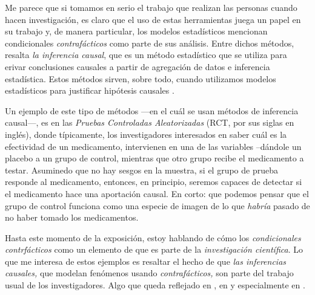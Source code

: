 Me parece que si tomamos en serio el trabajo que realizan las
personas cuando hacen investigación, es claro que el uso de estas
herramientas juega un papel en su trabajo y, de manera particular,
los modelos estadísticos mencionan condicionales
\emph{contrafácticos} como parte de sus análisis. Entre dichos
métodos, resalta \emph{la inferencia causal}, que es un método
estadístico que se utiliza para erivar conclusiones causales a
partir de agregación de datos e inferencia estadística. Estos
métodos sirven, sobre todo, cuando utilizamos modelos estadísticos
para justificar hipótesis causales \parencite{Pearl2016, Pearl2018}.

Un ejemplo de este tipo de métodos ---en el cuál se usan
métodos de inferencia causal---, es en las \emph{Pruebas Controladas
	Aleatorizadas} (RCT, por sus siglas en inglés), donde típicamente,
los investigadores interesados en saber cuál es la efectividad de un
medicamento, intervienen en una de las variables --dándole un
placebo a un grupo de control, mientras que otro grupo recibe el
medicamento a testar. Asuminedo que no hay sesgos en la muestra, si
el grupo de prueba responde al medicamento, entonces, en principio,
seremos capaces de detectar si el medicamento hace una aportación
causal. En corto: que podemos pensar que el grupo de control
funciona como una especie de imagen de lo que \emph{habría} pasado
de no haber tomado los medicamentos.

Hasta este momento de la exposición, estoy hablando de cómo los
\emph{condicionales contrfácticos} como un elemento de que es parte
de la \emph{investigación científica}. Lo que me interesa de estos
ejemplos es resaltar el hecho de que \emph{las inferencias causales,} que modelan fenómenos usando \emph{contrafácticos,} son parte del trabajo usual de los investigadores. Algo que queda reflejado en \parencite{Pearl2016}, en \parencite{Pearl2018} y especialmente en
\parencite{llaudet2023}.

